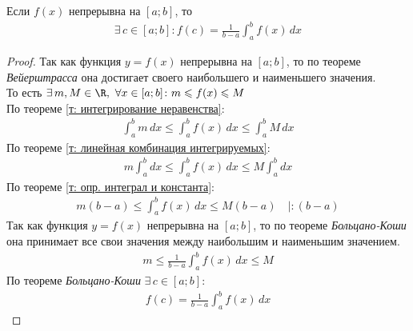 \begin{theorem}
    Если $f(x)$ непрерывна на $[a;b]$, то
    \begin{gather*}
        \exists\, c \in [a;b]\colon f(c) = \frac{1}{b-a} \int_{a}^{b} f(x)\, dx
    \end{gather*}
\end{theorem}
\begin{proof}
    Так как функция $y=f(x)$ непрерывна на $[a;b]$, то по теореме \textit{Вейерштрасса} она достигает своего наибольшего и наименьшего значения. \\
    То есть $\exists\, m, M \in \R,\ \forall x \in [a;b]\colon m \leqslant f(x) \leqslant M$ \\
    По теореме \ref{т: интегрирование неравенства}:
    \begin{gather*}
        \int_{a}^{b} m\, dx \leqslant \int_{a}^{b} f(x)\, dx \leqslant \int_{a}^{b} M\, dx
    \end{gather*}
    По теореме \ref{т: линейная комбинация интегрируемых}:
    \begin{gather*}
        m \int_{a}^{b} dx \leqslant \int_{a}^{b} f(x)\, dx \leqslant M \int_{a}^{b} dx
    \end{gather*}
    По теореме \ref{т: опр. интеграл и константа}:
    \begin{gather*}
        m(b-a) \leqslant \int_{a}^{b} f(x)\, dx \leqslant M(b-a)\quad | : (b-a)
    \end{gather*}
    Так как функция $y=f(x)$ непрерывна на $[a;b]$, то по теореме \textit{Больцано-Коши} она принимает все свои значения между наибольшим и наименьшим значением.
    \begin{gather*}
        m \leqslant \frac{1}{b-a} \int_{a}^{b} f(x)\, dx \leqslant M
    \end{gather*}
    По теореме \textit{Больцано-Коши} $\exists\, c \in [a;b]\colon$
    \begin{gather*}
        f(c) = \frac{1}{b-a} \int_{a}^{b} f(x)\, dx
    \end{gather*}
\end{proof}

\newpage
